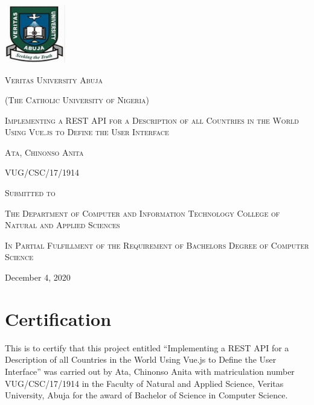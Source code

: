 \documentclass[twoside, a4paper, 12pt]{report}
\begin{document}
\begin{titlepage}
	\centering
	\includegraphics[width=0.2\textwidth]{VeritasUniversityLogo}\par\vspace{1cm}
	{\scshape \LARGE Veritas University Abuja \par}
	{\scshape \Large (The Catholic University of Nigeria) \par}
	\vspace{1cm}
	{\scshape \huge Implementing a REST API for a Description of all Countries in the World Using Vue.js to Define the User Interface \par}
	\vspace{1cm}
	{\scshape \Large Ata, Chinonso Anita \par}
	{\scshape \Large VUG/CSC/17/1914 \par}
	\vspace{0.5cm}
	\scshape Submitted to \par
	\vspace{0.5cm}
	{\scshape \Large The Department of Computer and Information Technology College of Natural and Applied 			Sciences \par}
	\vspace{1cm}
	{\scshape \Large In Partial Fulfillment of the Requirement of Bachelors Degree of Computer Science \par}
	\vfill
	{\Large December 4, 2020 \par}
\end{titlepage}


\chapter*{Certification}
This is to certify that this project entitled ``Implementing a REST API for a Description of all Countries in the World Using Vue.js to Define the User Interface” was carried out by Ata, Chinonso Anita with matriculation number VUG/CSC/17/1914 in the Faculty of Natural and Applied Science, Veritas University, Abuja for the award of Bachelor of Science in Computer Science.
\end{document}
